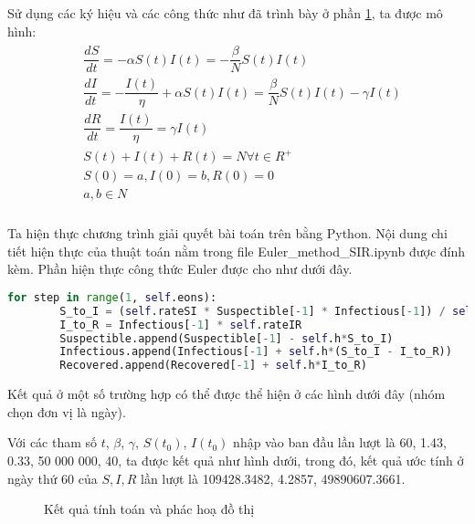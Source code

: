 \documentclass[a4paper]{article}
\begin{document}
Sử dụng các ký hiệu và các công thức như đã trình bày ở phần \hyperref[SIR]{1}, ta được mô hình: 
\begin{align*}
    \begin{split}
        & \dfrac{dS}{dt} = -\alpha S(t)I(t) = -\dfrac{\beta}{N} S(t)I(t) \\
        & \dfrac{dI}{dt} = - \dfrac{I(t)}{\eta} +  \alpha S(t)I(t) = \dfrac{\beta}{N} S(t)I(t) - \gamma I(t) \\
        & \dfrac{dR}{dt} = \dfrac{I(t)}{\eta} = \gamma I(t)\\
        & S(t) + I(t) + R(t) = N  \forall t \in R^{+} \\
        & S(0)=a, I(0)=b, R(0)=0 \\
        & a, b \in N \\
    \end{split}
\end{align*}


Ta hiện thực chương trình giải quyết bài toán trên bằng Python. Nội dung chi tiết hiện thực của thuật toán nằm trong file Euler\_method\_SIR.ipynb được đính kèm. Phần hiện thực công thức Euler được cho như dưới đây.\\
\begin{lstlisting}[language=Python]
    for step in range(1, self.eons):
        S_to_I = (self.rateSI * Suspectible[-1] * Infectious[-1]) / self.numIndividuals
        I_to_R = Infectious[-1] * self.rateIR
        Suspectible.append(Suspectible[-1] - self.h*S_to_I)
        Infectious.append(Infectious[-1] + self.h*(S_to_I - I_to_R))
        Recovered.append(Recovered[-1] + self.h*I_to_R)
\end{lstlisting}

Kết quả ở một số trường hợp có thể được thể hiện ở các hình dưới đây (nhóm chọn đơn vị là ngày). 

Với các tham số $t$, $\beta$, $\gamma$, $S(t_0)$, $I(t_0)$ nhập vào ban đầu lần lượt là 60, 1.43, 0.33, 50 000 000, 40, ta được kết quả như hình dưới, trong đó, kết quả ước tính ở ngày thứ 60 của $S, I, R$ lần lượt là 109428.3482, 4.2857, 49890607.3661.
\begin{figure}[ht]
    \newline
    \newline
    \label{pic: test_SIR_1}
    \caption{Kết quả tính toán và phác hoạ đồ thị}
\end{figure}
\end{document}
